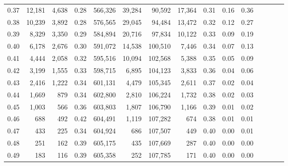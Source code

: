 \begin{tabular}{rrrcrrrrrrrrrrr}
0.37 &  12,181 &  4,638 &                                       0.28 &  566,326 &   39,284 &   90,592 &   17,364 &  0.31 &  0.16 &                         0.36 \\
0.38 &  10,239 &  3,892 &                                       0.28 &  576,565 &   29,045 &   94,484 &   13,472 &  0.32 &  0.12 &                         0.27 \\
0.39 &   8,329 &  3,350 &                                       0.29 &  584,894 &   20,716 &   97,834 &   10,122 &  0.33 &  0.09 &                         0.19 \\
0.40 &   6,178 &  2,676 &                                       0.30 &  591,072 &   14,538 &  100,510 &    7,446 &  0.34 &  0.07 &                         0.13 \\
0.41 &   4,444 &  2,058 &                                       0.32 &  595,516 &   10,094 &  102,568 &    5,388 &  0.35 &  0.05 &                         0.09 \\
0.42 &   3,199 &  1,555 &                                       0.33 &  598,715 &    6,895 &  104,123 &    3,833 &  0.36 &  0.04 &                         0.06 \\
0.43 &   2,416 &  1,222 &                                       0.34 &  601,131 &    4,479 &  105,345 &    2,611 &  0.37 &  0.02 &                         0.04 \\
0.44 &   1,669 &    879 &                                       0.34 &  602,800 &    2,810 &  106,224 &    1,732 &  0.38 &  0.02 &                         0.03 \\
0.45 &   1,003 &    566 &                                       0.36 &  603,803 &    1,807 &  106,790 &    1,166 &  0.39 &  0.01 &                         0.02 \\
0.46 &     688 &    492 &                                       0.42 &  604,491 &    1,119 &  107,282 &      674 &  0.38 &  0.01 &                         0.01 \\
0.47 &     433 &    225 &                                       0.34 &  604,924 &      686 &  107,507 &      449 &  0.40 &  0.00 &                         0.01 \\
0.48 &     251 &    162 &                                       0.39 &  605,175 &      435 &  107,669 &      287 &  0.40 &  0.00 &                         0.00 \\
0.49 &     183 &    116 &                                       0.39 &  605,358 &      252 &  107,785 &      171 &  0.40 &  0.00 &                         0.00 \\

\end{tabular}
